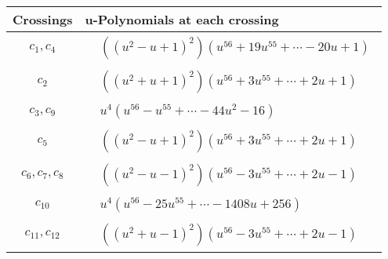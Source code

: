 \documentclass[1p]{elsarticle_modified}
\theoremstyle{definition}
\begin{document}
\begin{tabular}{m{50pt}|m{274pt}}
Crossings & \hspace{64pt}u-Polynomials at each crossing \\
\hline $$\begin{aligned}c_{1},c_{4}\end{aligned}$$&$\begin{aligned}
&((u^2- u+1)^2)(u^{56}+19 u^{55}+\cdots-20 u+1)
\end{aligned}$\\
\hline $$\begin{aligned}c_{2}\end{aligned}$$&$\begin{aligned}
&((u^2+u+1)^2)(u^{56}+3 u^{55}+\cdots+2 u+1)
\end{aligned}$\\
\hline $$\begin{aligned}c_{3},c_{9}\end{aligned}$$&$\begin{aligned}
&u^4(u^{56}- u^{55}+\cdots-44 u^2-16)
\end{aligned}$\\
\hline $$\begin{aligned}c_{5}\end{aligned}$$&$\begin{aligned}
&((u^2- u+1)^2)(u^{56}+3 u^{55}+\cdots+2 u+1)
\end{aligned}$\\
\hline $$\begin{aligned}c_{6},c_{7},c_{8}\end{aligned}$$&$\begin{aligned}
&((u^2- u-1)^2)(u^{56}-3 u^{55}+\cdots+2 u-1)
\end{aligned}$\\
\hline $$\begin{aligned}c_{10}\end{aligned}$$&$\begin{aligned}
&u^4(u^{56}-25 u^{55}+\cdots-1408 u+256)
\end{aligned}$\\
\hline $$\begin{aligned}c_{11},c_{12}\end{aligned}$$&$\begin{aligned}
&((u^2+u-1)^2)(u^{56}-3 u^{55}+\cdots+2 u-1)
\end{aligned}$\\
\hline
\end{tabular}\newpage\renewcommand{\arraystretch}{1}
\end{document}
